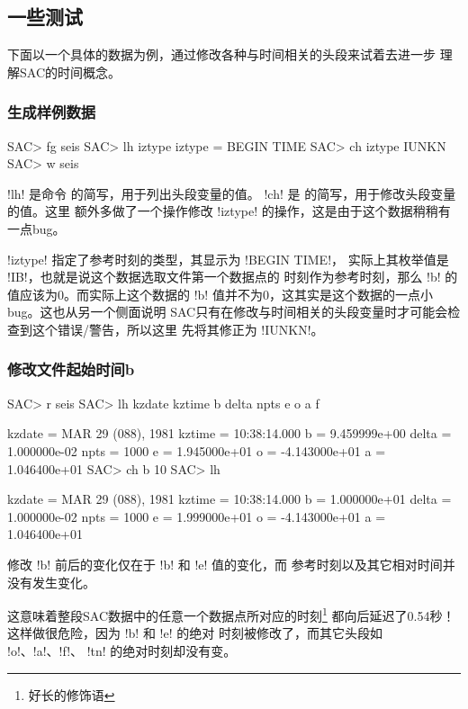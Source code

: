 \subsection{一些测试}
下面以一个具体的数据为例，通过修改各种与时间相关的头段来试着去进一步
理解SAC的时间概念。

\subsubsection{生成样例数据}
\begin{SACCode}
SAC> fg seis
SAC> lh iztype
    iztype = BEGIN TIME
SAC> ch iztype IUNKN
SAC> w seis
\end{SACCode}
!lh! 是命令  的简写，用于列出头段变量的值。
!ch! 是  的简写，用于修改头段变量的值。这里
额外多做了一个操作修改 !iztype! 的操作，这是由于这个数据稍稍有
一点bug。

!iztype! 指定了参考时刻的类型，其显示为 !BEGIN TIME!，
实际上其枚举值是 !IB!，也就是说这个数据选取文件第一个数据点的
时刻作为参考时刻，那么 !b! 的值应该为0。而实际上这个数据的
!b! 值并不为0，这其实是这个数据的一点小bug。这也从另一个侧面说明
SAC只有在修改与时间相关的头段变量时才可能会检查到这个错误/警告，所以这里
先将其修正为 !IUNKN!。

\subsubsection{修改文件起始时间b}
\begin{SACCode}
SAC> r seis
SAC> lh kzdate kztime b delta npts e o a f

     kzdate = MAR 29 (088), 1981
     kztime = 10:38:14.000
          b = 9.459999e+00
      delta = 1.000000e-02
       npts = 1000
          e = 1.945000e+01
          o = -4.143000e+01
          a = 1.046400e+01
SAC> ch b 10
SAC> lh

     kzdate = MAR 29 (088), 1981
     kztime = 10:38:14.000
          b = 1.000000e+01
      delta = 1.000000e-02
       npts = 1000
          e = 1.999000e+01
          o = -4.143000e+01
          a = 1.046400e+01
\end{SACCode}

修改 !b! 前后的变化仅在于 !b! 和 !e! 值的变化，而
参考时刻以及其它相对时间并没有发生变化。

这意味着整段SAC数据中的任意一个数据点所对应的时刻\footnote{好长的修饰语}
都向后延迟了0.54秒！这样做很危险，因为 !b! 和 !e! 的绝对
时刻被修改了，而其它头段如 !o!、!a!、!f!、
!tn! 的绝对时刻却没有变。


